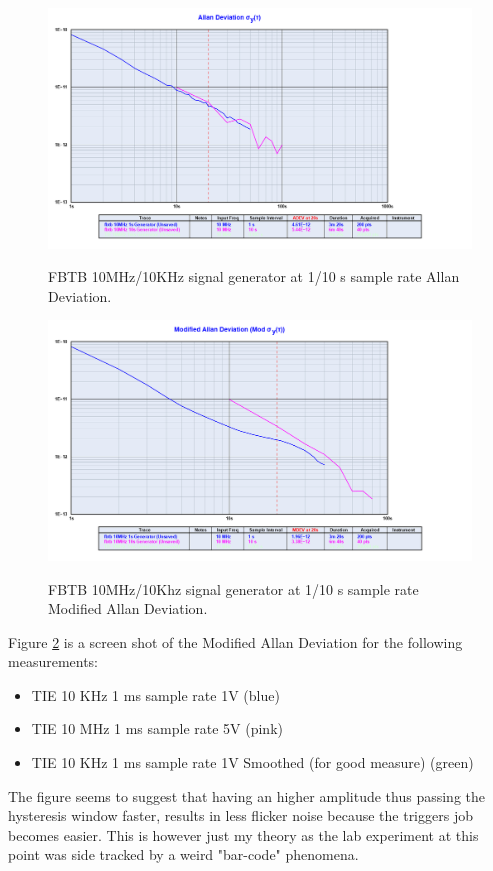 \documentclass[11pt,english,a4paper]{article}
\begin{document}
\begin{figure}[!htb]
  \caption{FBTB 10MHz/10KHz signal generator at 1/10 s sample rate Allan Deviation.}
  \centering
    \includegraphics[width=1\textwidth]{fbtb_10mhzkhz_generator_allan.png}
    \label{fig:sg_10x_allan_dev}
\end{figure}

\begin{figure}[!htb]
  \caption{FBTB 10MHz/10Khz signal generator at 1/10 s sample rate Modified Allan Deviation.}
  \centering
    \includegraphics[width=1\textwidth]{fbtb_10mhzkhz_generator_mod_allan.png}
    \label{fig:sg_10x_mod_allan_dev}
\end{figure}

Figure \ref{fig:sg_10x_mod_allan_dev} is a screen shot of the Modified Allan Deviation for the following measurements:
\begin{itemize}
  \item TIE 10 KHz 1 ms sample rate 1V (blue)
  \item TIE 10 MHz 1 ms sample rate 5V (pink)
  \item TIE 10 KHz 1 ms sample rate 1V Smoothed (for good measure) (green)
\end{itemize}
The figure seems to suggest that having an higher amplitude thus passing the hysteresis window faster, results in less flicker noise because the triggers job becomes easier. This is however just my theory as the lab experiment at this point was side tracked by a weird "bar-code" phenomena.
\end{document}
